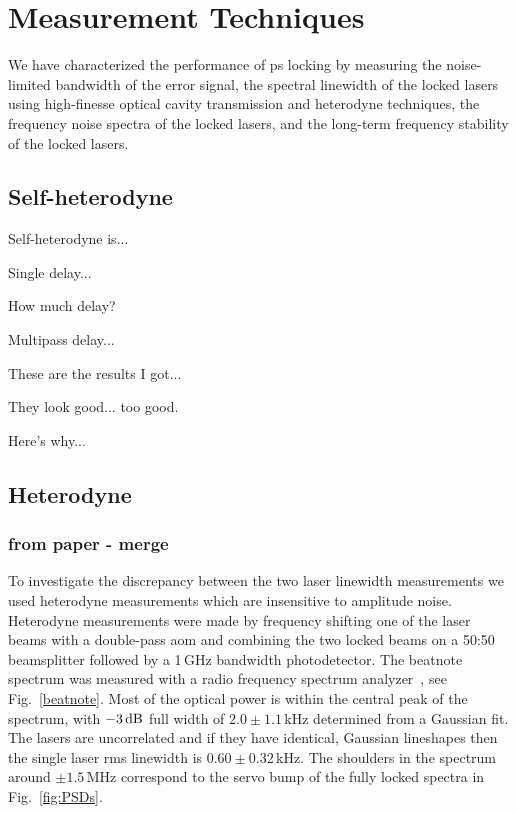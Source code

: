 \section{Measurement Techniques}
We have characterized the performance of \gls*{ps} locking by measuring the noise-limited bandwidth of the error signal, the spectral linewidth of the locked lasers using high-finesse optical cavity transmission and heterodyne techniques, the frequency noise spectra of the locked lasers, and the long-term frequency stability of the locked lasers.

\subsection{Self-heterodyne}

Self-heterodyne is...

Single delay...

How much delay?

Multipass delay...

These are the results I got...

They look good... too good.

Here's why...\cite{richter_linewidth_1986}

\subsection{Heterodyne}
\subsubsection{from paper - merge}
To investigate the discrepancy between the two laser linewidth measurements we used heterodyne measurements which are insensitive to amplitude noise.
Heterodyne measurements were made by frequency shifting one of the laser beams with a double-pass \gls*{aom} and combining the two locked beams on a 50:50 beamsplitter followed by a 1\,GHz bandwidth photodetector.
The beatnote spectrum was measured with a radio frequency spectrum analyzer~\cite{equipment}, see Fig.~\ref{beatnote}.
Most of the optical power is within the central peak of the spectrum, with $-3\rm\,dB$ full width of $2.0\pm1.1$\,kHz determined from a Gaussian fit.
The lasers are uncorrelated and if they have identical, Gaussian lineshapes then the single laser \gls*{rms} linewidth is $0.60\pm0.32$\,kHz.
The shoulders in the spectrum around $\pm1.5$\,MHz correspond to the servo bump of the fully locked spectra in Fig.~\ref{fig:PSDs}.

